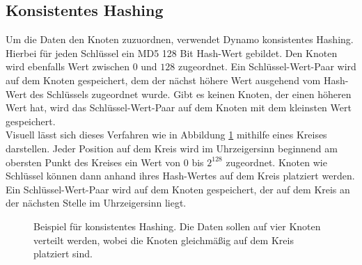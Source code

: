 \subsection{Konsistentes Hashing}
Um die Daten den Knoten zuzuordnen, verwendet Dynamo konsistentes Hashing. Hierbei für jeden Schlüssel ein MD5 128 Bit Hash-Wert gebildet. Den Knoten wird ebenfalls Wert zwischen $0$ und $128$ zugeordnet. Ein Schlüssel-Wert-Paar wird auf dem Knoten gespeichert, dem der nächst höhere Wert ausgehend vom Hash-Wert des Schlüssels zugeordnet wurde. Gibt es keinen Knoten, der einen höheren Wert hat, wird das Schlüssel-Wert-Paar auf dem Knoten mit dem kleinsten Wert gespeichert.\\
Visuell lässt sich dieses Verfahren wie in Abbildung \ref{fig:bspKonHash} mithilfe eines Kreises darstellen. Jeder Position auf dem Kreis wird im Uhrzeigersinn beginnend am obersten Punkt des Kreises ein Wert von $0$ bis $2^{128}$ zugeordnet. Knoten wie Schlüssel können dann anhand ihres Hash-Wertes auf dem Kreis platziert werden. Ein Schlüssel-Wert-Paar wird auf dem Knoten gespeichert, der auf dem Kreis an der nächsten Stelle im Uhrzeigersinn liegt.
\begin{figure}
	\caption{Beispiel für konsistentes Hashing. Die Daten sollen auf vier Knoten verteilt werden, wobei die Knoten gleichmäßig auf dem Kreis platziert sind.}
	\label{fig:bspKonHash}
	\centering
\end{figure}
